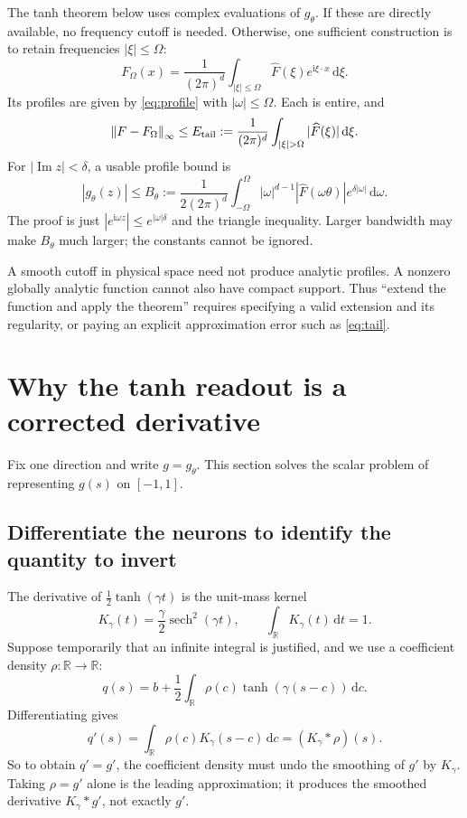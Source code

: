 \documentclass[11pt]{article}
\newcommand{\R}{\mathbb R}
\newcommand{\ii}{\mathrm i}
\newcommand{\dd}{\,\mathrm d}
\newcommand{\sech}{\operatorname{sech}}
\newcommand{\Imag}{\operatorname{Im}}
\newcommand{\norm}[1]{\left\lVert#1\right\rVert}
\begin{document}
The tanh theorem below uses complex evaluations of $g_\theta$. If these are directly available, no frequency cutoff is needed. Otherwise, one sufficient construction is to retain frequencies $|\xi|\le\Omega$:
\[
 F_\Omega(x)=\frac1{(2\pi)^d}\int_{|\xi|\le\Omega}
 \widehat F(\xi)e^{\ii\xi\cdot x}\dd\xi.
\]
Its profiles are given by \eqref{eq:profile} with $|\omega|\le\Omega$. Each is entire, and
\begin{equation}
 \norm{F-F_\Omega}_\infty\le
 E_{\rm tail}:=\frac1{(2\pi)^d}\int_{|\xi|>\Omega}|\widehat F(\xi)|\dd\xi.
 \label{eq:tail}
\end{equation}
For $|\Imag z|<\delta$, a usable profile bound is
\begin{equation}
 |g_\theta(z)|\le B_\theta:=%
 \frac1{2(2\pi)^d}\int_{-\Omega}^{\Omega}
 |\omega|^{d-1}|\widehat F(\omega\theta)|e^{\delta|\omega|}\dd\omega.
 \label{eq:bandlimited-bound}
\end{equation}
The proof is just $|e^{\ii\omega z}|\le e^{|\omega|\delta}$ and the triangle inequality. Larger bandwidth may make $B_\theta$ much larger; the constants cannot be ignored.

A smooth cutoff in physical space need not produce analytic profiles. A nonzero globally analytic function cannot also have compact support. Thus ``extend the function and apply the theorem'' requires specifying a valid extension and its regularity, or paying an explicit approximation error such as \eqref{eq:tail}.

\section{Why the tanh readout is a corrected derivative}
Fix one direction and write $g=g_\theta$. This section solves the scalar problem of representing $g(s)$ on $[-1,1]$.

\subsection{Differentiate the neurons to identify the quantity to invert}

The derivative of $\tfrac12\tanh(\gamma t)$ is the unit-mass kernel
\begin{equation}
 K_\gamma(t)=\frac{\gamma}{2}\sech^2(\gamma t),\qquad
 \int_\R K_\gamma(t)\dd t=1.
 \label{eq:tanh-kernel}
\end{equation}
Suppose temporarily that an infinite integral is justified, and we use a coefficient density $\rho:\R\to\R$:
\[
 q(s)=b+\frac12\int_\R\rho(c)\tanh(\gamma(s-c))\dd c.
\]
Differentiating gives
\begin{equation}
 q'(s)=\int_\R\rho(c)K_\gamma(s-c)\dd c=(K_\gamma*\rho)(s).
 \label{eq:convolution}
\end{equation}
So to obtain $q'=g'$, the coefficient density must undo the smoothing of $g'$ by $K_\gamma$. Taking $\rho=g'$ alone is the leading approximation; it produces the smoothed derivative $K_\gamma*g'$, not exactly $g'$.
\end{document}
